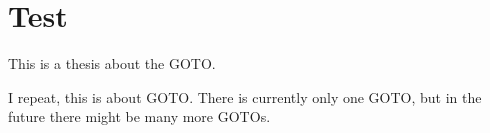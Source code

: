 \chapter{Test}
\label{chpt:label}
\newpage

This is a thesis about the \ac{GOTO}.

I repeat, this is about \ac{GOTO}. There is currently only one \ac{GOTO}, but in the future there might be many more \ac{GOTO}s.

\lipsum[1-5]

